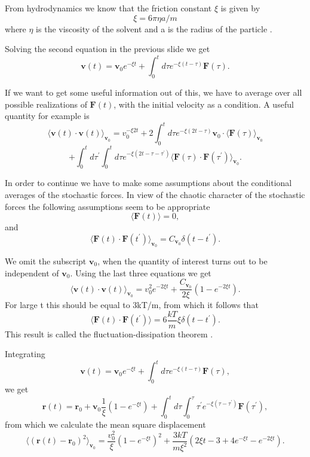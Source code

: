 \noindent
From hydrodynamics  we know that the friction constant  $\xi$ is given by
\[
\xi =6\pi \eta a/m 
\]
where $\eta$ is the viscosity  of the solvent and a is the radius of the particle .

Solving the second equation in the previous slide we get 
\[
\mathbf{v}(t)=\mathbf{v}_{0}e^{-\xi t}+\int_{0}^{t}d\tau e^{-\xi (t-\tau )}\mathbf{F }(\tau ). 
\]

If we want to get some useful information out of this, we have to average over all possible realizations of 
$\mathbf{F}(t)$, with the initial velocity as a condition. A useful quantity for example is
\[ 
\langle \mathbf{v}(t)\cdot \mathbf{v}(t)\rangle_{\mathbf{v}_{0}}=v_{0}^{-\xi 2t}
+2\int_{0}^{t}d\tau e^{-\xi (2t-\tau)}\mathbf{v}_{0}\cdot \langle \mathbf{F}(\tau )\rangle_{\mathbf{v}_{0}}
\]
\[  	  	
 +\int_{0}^{t}d\tau ^{\prime }\int_{0}^{t}d\tau e^{-\xi (2t-\tau -\tau ^{\prime })}
\langle \mathbf{F}(\tau )\cdot \mathbf{F}(\tau ^{\prime })\rangle_{ \mathbf{v}_{0}}.
\]

In order to continue we have to make some assumptions about the conditional averages of the stochastic forces. 
In view of the chaotic character of the stochastic forces the following 
assumptions seem to be appropriate
\[ 
\langle \mathbf{F}(t)\rangle=0, 
\]
and
\[
\langle \mathbf{F}(t)\cdot \mathbf{F}(t^{\prime })\rangle_{\mathbf{v}_{0}}=  C_{\mathbf{v}_{0}}\delta (t-t^{\prime }).
\] 	

We omit the subscript $\mathbf{v}_{0}$, when the quantity of interest turns out to be independent of $\mathbf{v}_{0}$. Using the last three equations we get
 \[
\langle \mathbf{v}(t)\cdot \mathbf{v}(t)\rangle_{\mathbf{v}_{0}}=v_{0}^{2}e^{-2\xi t}+\frac{C_{\mathbf{v}_{0}}}{2\xi }(1-e^{-2\xi t}).
\]
For large t this should be equal to 3kT/m, from which it follows that
\[
\langle \mathbf{F}(t)\cdot \mathbf{F}(t^{\prime })\rangle =6\frac{kT}{m}\xi \delta (t-t^{\prime }). 
\]
This result is called the fluctuation-dissipation theorem .

Integrating 
 \[ 
\mathbf{v}(t)=\mathbf{v}_{0}e^{-\xi t}+\int_{0}^{t}d\tau e^{-\xi (t-\tau )}\mathbf{F }(\tau ), 
\] 
we get
\[
\mathbf{r}(t)=\mathbf{r}_{0}+\mathbf{v}_{0}\frac{1}{\xi }(1-e^{-\xi t})+
\int_0^td\tau \int_0^{\tau}\tau ^{\prime } e^{-\xi (\tau -\tau ^{\prime })}\mathbf{F}(\tau ^{\prime }), 
\]
from which we calculate the mean square displacement 
\[
\langle ( \mathbf{r}(t)-\mathbf{r}_{0})^{2}\rangle _{\mathbf{v}_{0}}=\frac{v_0^2}{\xi}(1-e^{-\xi t})^{2}+\frac{3kT}{m\xi ^{2}}(2\xi t-3+4e^{-\xi t}-e^{-2\xi t}). 
\]

